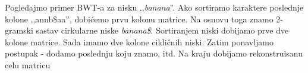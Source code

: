 Pogledajmo primer BWT-a za nisku ‚‚\textit{banana}''. Ako sortiramo karaktere poslednje kolone ‚‚annb\$aa'', dobićemo prvu kolonu matrice. Na osnovu toga znamo 2-gramski sastav cirkularne niske \textit{banana\$}. Sortiranjem niski dobijamo prve dve kolone matrice. Sada imamo dve kolone cikličnih niski. Zatim ponavljamo postupak - dodamo poslednju koju znamo, itd. Na kraju dobijamo rekonstruisanu celu matricu


